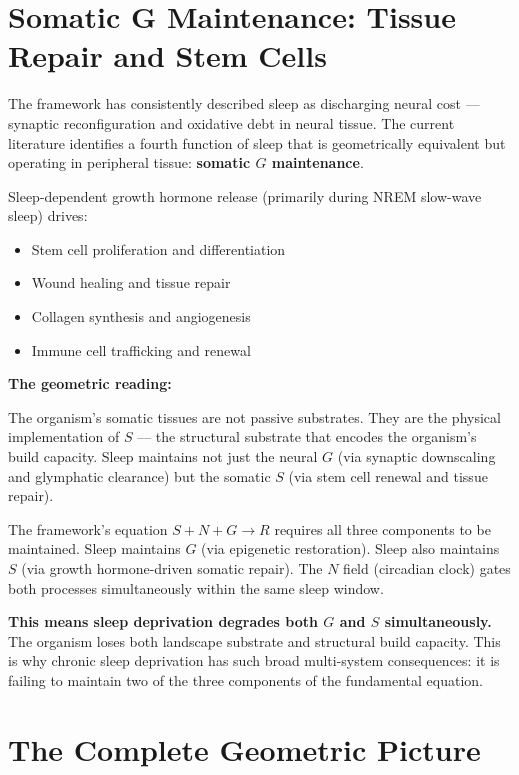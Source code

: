 \documentclass[10pt, a4paper]{article}
\begin{document}
\section{Somatic G Maintenance: Tissue
Repair and Stem Cells}
\label{sec:somatic}

The framework has consistently described
sleep as discharging neural cost ---
synaptic reconfiguration and oxidative
debt in neural tissue. The current
literature identifies a fourth function
of sleep that is geometrically equivalent
but operating in peripheral tissue:
\textbf{somatic $G$ maintenance}.

Sleep-dependent growth hormone release
(primarily during NREM slow-wave sleep)
drives:
\begin{itemize}[itemsep=0.2em]
  \item Stem cell proliferation and
    differentiation
  \item Wound healing and tissue repair
  \item Collagen synthesis and
    angiogenesis
  \item Immune cell trafficking and
    renewal
\end{itemize}

\textbf{The geometric reading:}

The organism's somatic tissues are not
passive substrates. They are the
physical implementation of $S$ --- the
structural substrate that encodes the
organism's build capacity. Sleep
maintains not just the neural $G$
(via synaptic downscaling and
glymphatic clearance) but the somatic
$S$ (via stem cell renewal and tissue
repair).

The framework's equation
$S + N + G \rightarrow R$ requires all
three components to be maintained.
Sleep maintains $G$ (via epigenetic
restoration). Sleep also maintains $S$
(via growth hormone-driven somatic
repair). The $N$ field (circadian clock)
gates both processes simultaneously
within the same sleep window.

\textbf{This means sleep deprivation
degrades both $G$ and $S$ simultaneously.}
The organism loses both landscape
substrate and structural build capacity.
This is why chronic sleep deprivation
has such broad multi-system consequences:
it is failing to maintain two of the
three components of the fundamental
equation.

\section{The Complete Geometric Picture}
\label{sec:picture}
\end{document}
